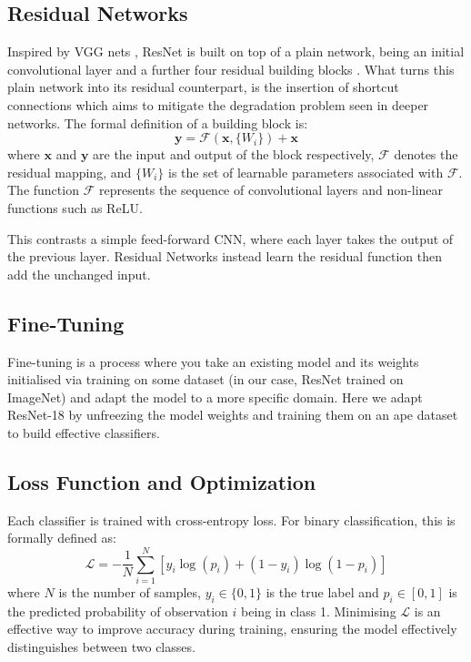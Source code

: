 \documentclass[author={Jacob Stephenson},
    degree={BSc},
    title={Robust Great Ape Species Detection in Wild Camera Trap Imagery with Promptable Concept Segmentation},
    unit={COMS30045},
    subtitle={}]{dissertation}
\begin{document}
\subsection{Residual Networks}
\label{sec:bg_resnet}

Inspired by VGG nets \cite{simonyan2015deepconvolutionalnetworkslargescale}, ResNet is built on top of a plain network, being an initial convolutional layer and a further four residual building blocks \cite{he2015deepresiduallearningimage}. What turns this plain network into its residual counterpart, is the insertion of shortcut connections which aims to mitigate the degradation problem seen in deeper networks. The formal definition of a building block is:
\begin{equation}
    \label{eq:resnet}
    \textbf{y} = \mathcal{F}(\textbf{x}, \{W_i\}) + \textbf{x}
\end{equation}
where $\textbf{x}$ and $\textbf{y}$ are the input and output of the block respectively, $\mathcal{F}$ denotes the residual mapping, and $\{W_i\}$ is the set of learnable parameters associated with $\mathcal{F}$. The function $\mathcal{F}$ represents the sequence of convolutional layers and non-linear functions such as ReLU.

This contrasts a simple feed-forward CNN, where each layer takes the output of the previous layer. Residual Networks instead learn the residual function then add the unchanged input.

\subsection{Fine-Tuning}

Fine-tuning is a process where you take an existing model and its weights initialised via training on some dataset (in our case, ResNet trained on ImageNet) and adapt the model to a more specific domain. Here we adapt ResNet-18 by unfreezing the model weights and training them on an ape dataset to build effective classifiers.

\subsection{Loss Function and Optimization}

Each classifier is trained with cross-entropy loss. For binary classification, this is formally defined as:
\begin{equation}
    \mathcal{L} =  -\frac{1}{N} \sum^N_{i=1}{\left[ y_i \log(p_i) + (1 - y_i) \log(1 - p_i) \right]}
\end{equation}
where $N$ is the number of samples, $y_i \in \{0, 1\}$ is the true label and $p_i \in \left[0, 1 \right]$ is the predicted probability of observation $i$ being in class 1. Minimising $\mathcal{L}$ is an effective way to improve accuracy during training, ensuring the model effectively distinguishes between two classes.
\end{document}
